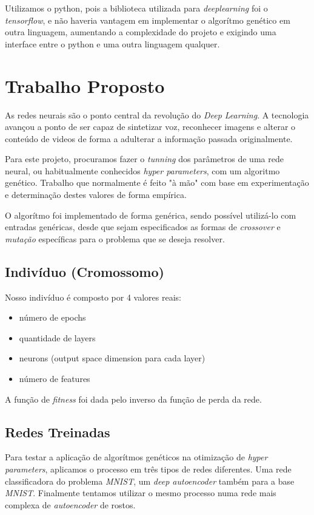 \documentclass[twoside,conference,a4paper]{IEEEtran}
\begin{document}
Utilizamos o python, pois a biblioteca utilizada para \emph{deeplearning} foi o \emph{tensorflow}, e não haveria vantagem em implementar o algorítmo genético em outra linguagem, aumentando a complexidade do projeto e exigindo uma interface entre o python e uma outra linguagem qualquer.

\section{Trabalho Proposto}

As redes neurais são o ponto central da revolução do \emph{Deep Learning}. A tecnologia avançou a ponto de ser capaz de sintetizar voz, reconhecer imagens e alterar o conteúdo de videos de forma a adulterar a informação passada originalmente.

Para este projeto, procuramos fazer o \emph{tunning} dos parâmetros de uma rede neural, ou habitualmente conhecidos \emph{hyper parameters}, com um algoritmo genético. Trabalho que normalmente é feito "à mão" com base em experimentação e determinação destes valores de forma empírica.

O algorítmo foi implementado de forma genérica, sendo possível utilizá-lo com entradas genéricas, desde que sejam especificados as formas de \emph{crossover} e \emph{mutação} específicas para o problema que se deseja resolver.



\subsection{Indivíduo (Cromossomo)}

Nosso indivíduo é composto por 4 valores reais:

\begin{itemize}
    \item número de epochs
    \item quantidade de layers
    \item neurons (output space dimension para cada layer)
    \item número de features
\end{itemize}

A função de \emph{fitness} foi dada pelo inverso da função de perda da rede.

\subsection{Redes Treinadas}
Para testar a aplicação de algorítmos genéticos na otimização de \emph{hyper parameters}, aplicamos o processo em três tipos de redes diferentes. Uma rede classificadora do problema \emph{MNIST}, um \emph{deep autoencoder} também para a base \emph{MNIST}. Finalmente tentamos utilizar o mesmo processo numa rede mais complexa de \emph{autoencoder} de rostos.
\end{document}
